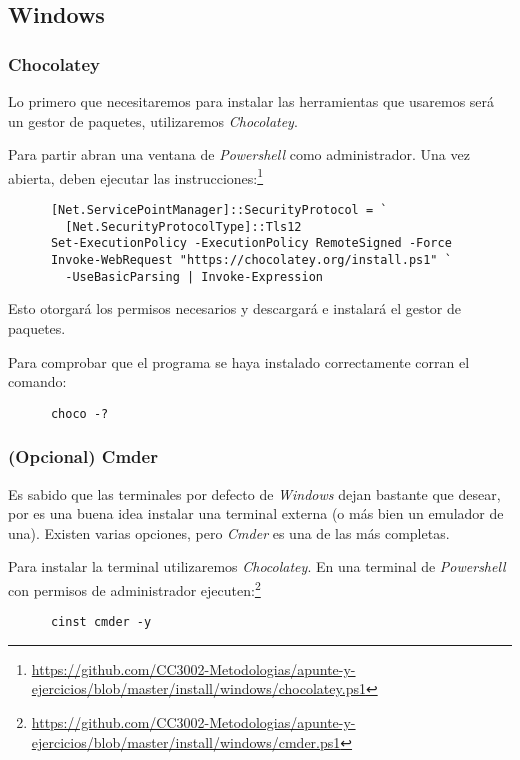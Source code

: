 \subsection{Windows}
  \label{sec:jdk-windows}
  \subsubsection{Chocolatey}
    Lo primero que necesitaremos para instalar las herramientas que usaremos será un gestor de 
    paquetes, utilizaremos \textit{Chocolatey}.\autocite{choco}

    Para partir abran una ventana de \textit{Powershell} como administrador.
    Una vez abierta, deben ejecutar las instrucciones:\footnote{
      \url{https://github.com/CC3002-Metodologias/apunte-y-ejercicios/blob/master/install/windows/chocolatey.ps1}
    }
    \begin{verbatim}
      [Net.ServicePointManager]::SecurityProtocol = `
        [Net.SecurityProtocolType]::Tls12
      Set-ExecutionPolicy -ExecutionPolicy RemoteSigned -Force
      Invoke-WebRequest "https://chocolatey.org/install.ps1" `
        -UseBasicParsing | Invoke-Expression
    \end{verbatim}

    Esto otorgará los permisos necesarios y descargará e instalará el gestor de paquetes.

    Para comprobar que el programa se haya instalado correctamente corran el comando:
    \begin{verbatim}
      choco -?
    \end{verbatim}

  \subsubsection{(Opcional) Cmder}
    Es sabido que las terminales por defecto de \textit{Windows} dejan bastante que desear, 
    por es una buena idea instalar una terminal externa (o más bien un emulador de una).
    Existen varias opciones, pero \textit{Cmder} es una de las más completas.

    Para instalar la terminal utilizaremos \textit{Chocolatey}.
    En una terminal de \textit{Powershell} con permisos de administrador ejecuten:\footnote{
      \url{https://github.com/CC3002-Metodologias/apunte-y-ejercicios/blob/master/install/windows/cmder.ps1}
    }

    \begin{verbatim}
      cinst cmder -y
    \end{verbatim}

